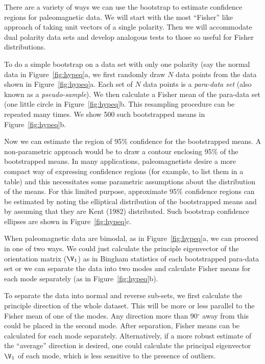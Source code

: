  
There are a variety of ways we can use the bootstrap to estimate confidence regions for paleomagnetic data.  We will start with the most ``Fisher'' like approach of taking unit vectors of a single polarity.  Then we will accommodate dual polarity data sets and develop analogous tests to those so useful for Fisher distributions.  

To do a simple 
bootstrap on a data set with only one polarity (say the normal data in Figure~\ref{fig:hypeq}a,  we first 
 randomly draw $N$ data points from the data shown in
Figure~\ref{fig:hypeq}a.  
Each set of $N$ data points is a {\it para-data set} (also known as a {\it pseudo-sample}).   We then calculate a Fisher mean of the para-data set (one little circle in Figure~\ref{fig:hypeq}b.  This resampling procedure can be repeated many times.  We show 500 such bootstrapped means in Figure~\ref{fig:hypeq}b.    
 
Now we can estimate the region of 95\% confidence for the
bootstrapped means.  A non-parametric approach would be to
draw a contour enclosing 95\% of the bootstrapped means.   In many applications,
paleomagnetists desire a more compact way of expressing
confidence regions (for example, to list them in a table)
and this necessitates some parametric assumptions
about the distribution of the means.   For this limited purpose,
approximate 95\% confidence regions can be estimated by noting the elliptical distribution of the bootstrapped means and by assuming that they are  
\nocite{kent82}
Kent (1982) distributed.  Such bootstrap confidence ellipses are shown in Figure~\ref{fig:hypeq}c.  

 When paleomagnetic data are bimodal,  as in Figure~\ref{fig:hypeq}a, we can proceed in one of two ways.  We could just calculate the principle eigenvector of the orientation matrix ($\V_1$) as in Bingham statistics  of each bootstrapped para-data set or we can separate the data into two modes and calculate Fisher means for each mode separately (as in Figure~\ref{fig:hypeq}b).    

 To  separate the data into normal and reverse sub-sets, we first calculate the principle direction of the whole dataset.   This will be more or less parallel to the Fisher mean of one of the modes.  Any direction more than 90$^{\circ}$ away from this could be placed in the second mode.      After separation, Fisher means can be calculated for each mode separately.   Alternatively, if a
more robust estimate of the ``average'' direction is desired, one could calculate the 
principal eigenvector $\V_1$ of each mode, which is less sensitive to the presence of outliers.




